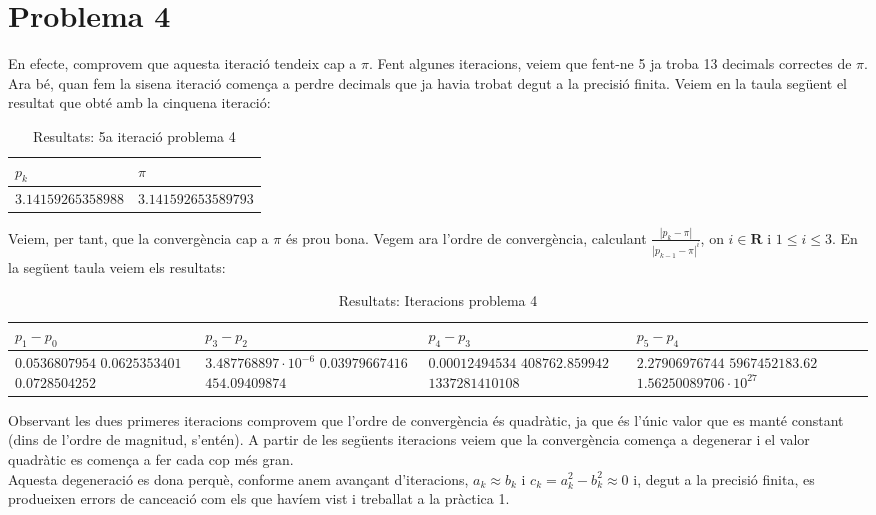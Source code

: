 \documentclass[11pt]{article}
\begin{document}
\section*{Problema 4}
	En efecte, comprovem que aquesta iteració tendeix cap a $\pi$. Fent algunes iteracions, veiem que fent-ne 5 ja troba 13 decimals correctes de $\pi$. Ara bé, quan fem la sisena iteració comença a perdre decimals que ja havia trobat degut a la precisió finita. Veiem en la taula següent el resultat que obté amb la cinquena iteració:
	\begin{table}[H]
		\begin{center}
			\begin{tabular}[c]{|p{32mm}|p{32 mm}|}
			\hline 
			$p_k$ & $\pi$\\ 
			\hline 
			$3.14159265358988$
			& 
			$3.141592653589793$
			\\
			\hline
			\end{tabular}
		\caption{Resultats: 5a iteració problema 4}
		\end{center}
	\end{table}
	Veiem, per tant, que la convergència cap a $\pi$ és prou bona. Vegem ara l'ordre de convergència, calculant $\frac{|p_k - \pi|}{|p_{k-1} - \pi|^i}$, on $i \in \mathbf{R}$ i $1 \leq i \leq 3$. En la següent taula veiem els resultats:
	\begin{table}[H]
		\begin{center}
			\begin{tabular}[c]{|p{22mm}|p{30mm}|p{25mm}|p{34mm}|}
			\hline 
			$p_1 - p_0$& $p_3 - p_2$ & $p_4 - p_3$ & $p_5 - p_4$ \\ 
			\hline 
			$0.0536807954$
			$0.0625353401$
			$0.0728504252$
			&  
			$3.487768897 \cdot 10^{-6}$
			$0.03979667416$
			$454.09409874$
			&
			$0.00012494534$
			$408762.859942$
			$1337281410108$
			&
			$2.27906976744$
			$5967452183.62$
			$1.56250089706 \cdot 10^{27}$
			\\
			\hline
			\end{tabular}
		\caption{Resultats: Iteracions problema 4}
		\end{center}
	\end{table}
	Observant les dues primeres iteracions comprovem que l'ordre de convergència és quadràtic, ja que és l'únic valor que es manté constant (dins de l'ordre de magnitud, s'entén). A partir de les següents iteracions veiem que la convergència comença a degenerar i el valor quadràtic es comença a fer cada cop més gran.\\
	Aquesta degeneració es dona perquè, conforme anem avançant d'iteracions, $a_k \approx b_k$ i $c_k = a_k^2 - b_k^2 \approx 0$ i, degut a la precisió finita, es produeixen errors de cance\lgem ació com els que havíem vist i treballat a la pràctica 1.
	\newpage
\end{document}
